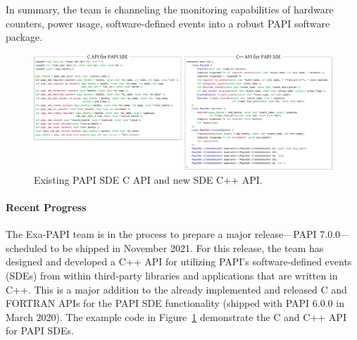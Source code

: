 %
In summary, the team is channeling the monitoring capabilities of hardware 
counters, power usage, software-defined events into a robust PAPI software 
package. 
%
\begin{figure}[!h]
\begin{center}
\includegraphics[width=0.88\linewidth]{projects/2.3.2-Tools/2.3.2.06-EXA-PAPI/papi_sde.pdf}
\caption{Existing PAPI SDE C API and new SDE C++ API.}
\label{fig:papi_sde}
\end{center}
\end{figure}


\paragraph{Recent Progress}

The Exa-PAPI team is in the process to prepare a major release---PAPI 7.0.0---scheduled
to be shipped in November 2021. For this release, the team has  
designed and developed a C++ API for utilizing PAPI's software-defined events (SDEs) 
from within third-party libraries and applications that are written in C++. 
This is a major addition to the already implemented and released 
C and FORTRAN APIs for the PAPI SDE functionality (shipped with PAPI 6.0.0 in 
March 2020). The example code in Figure~\ref{fig:papi_sde} demonstrate  the 
C and C++ API for PAPI SDEs. 
%

